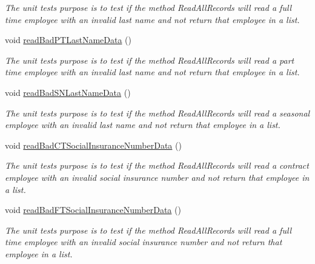 \begin{DoxyCompactItemize}
\begin{DoxyCompactList}\small\item\em The unit test\textquotesingle{}s purpose is to test if the method Read\+All\+Records will read a full time employee with an invalid last name and not return that employee in a list. \end{DoxyCompactList}\item 
void \hyperlink{class_file_i_o_tests_1_1_file_i_o_tests_a73dbb713735d66b7744de925f2f8e529}{read\+Bad\+P\+T\+Last\+Name\+Data} ()
\begin{DoxyCompactList}\small\item\em The unit test\textquotesingle{}s purpose is to test if the method Read\+All\+Records will read a part time employee with an invalid last name and not return that employee in a list. \end{DoxyCompactList}\item 
void \hyperlink{class_file_i_o_tests_1_1_file_i_o_tests_a2e633e57ec62bb740be9d40341c8f15a}{read\+Bad\+S\+N\+Last\+Name\+Data} ()
\begin{DoxyCompactList}\small\item\em The unit test\textquotesingle{}s purpose is to test if the method Read\+All\+Records will read a seasonal employee with an invalid last name and not return that employee in a list. \end{DoxyCompactList}\item 
void \hyperlink{class_file_i_o_tests_1_1_file_i_o_tests_a59c16b6763506888dd7d7d11dc3e9fca}{read\+Bad\+C\+T\+Social\+Insurance\+Number\+Data} ()
\begin{DoxyCompactList}\small\item\em The unit test\textquotesingle{}s purpose is to test if the method Read\+All\+Records will read a contract employee with an invalid social insurance number and not return that employee in a list. \end{DoxyCompactList}\item 
void \hyperlink{class_file_i_o_tests_1_1_file_i_o_tests_a9a69d9d30331bea2e36dcd41bc6393b7}{read\+Bad\+F\+T\+Social\+Insurance\+Number\+Data} ()
\begin{DoxyCompactList}\small\item\em The unit test\textquotesingle{}s purpose is to test if the method Read\+All\+Records will read a full time employee with an invalid social insurance number and not return that employee in a list. \end{DoxyCompactList}\item 

\end{DoxyCompactItemize}

